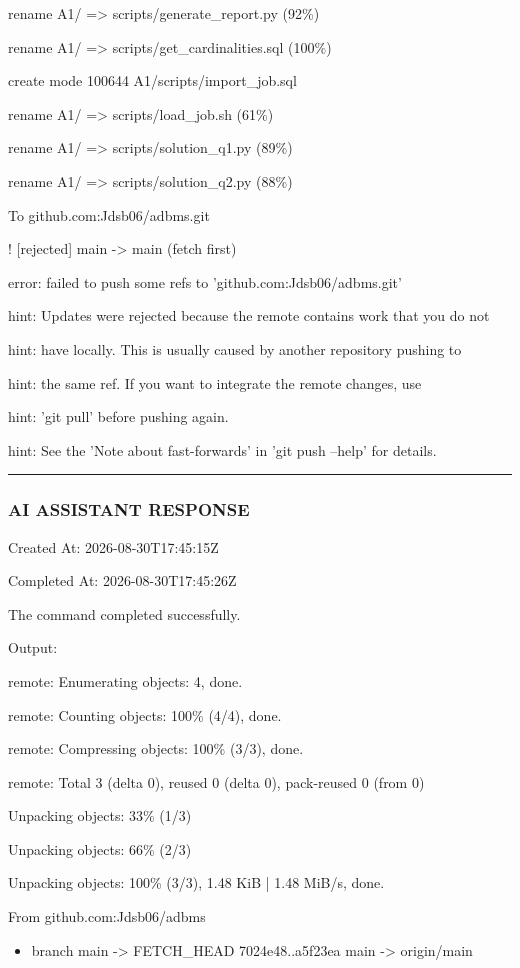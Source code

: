 \documentclass[11pt,a4paper]{article}
\begin{document}
{rename A1/{ => scripts}/generate\_report.py (92\%)

rename A1/{ => scripts}/get\_cardinalities.sql (100\%)

create mode 100644 A1/scripts/import\_job.sql

rename A1/{ => scripts}/load\_job.sh (61\%)

rename A1/{ => scripts}/solution\_q1.py (89\%)

rename A1/{ => scripts}/solution\_q2.py (88\%)

To github.com:Jdsb06/adbms.git

! [rejected]        main -> main (fetch first)

error: failed to push some refs to 'github.com:Jdsb06/adbms.git'

hint: Updates were rejected because the remote contains work that you do not

hint: have locally. This is usually caused by another repository pushing to

hint: the same ref. If you want to integrate the remote changes, use

hint: 'git pull' before pushing again.

hint: See the 'Note about fast-forwards' in 'git push --help' for details.


\hrule

\subsubsection{AI ASSISTANT RESPONSE}

Created At: 2026-08-30T17:45:15Z

Completed At: 2026-08-30T17:45:26Z


The command completed successfully.

Output:

remote: Enumerating objects: 4, done.

remote: Counting objects: 100\% (4/4), done.

remote: Compressing objects: 100\% (3/3), done.

remote: Total 3 (delta 0), reused 0 (delta 0), pack-reused 0 (from 0)

Unpacking objects:  33\% (1/3)

Unpacking objects:  66\% (2/3)

Unpacking objects: 100\% (3/3), 1.48 KiB | 1.48 MiB/s, done.

From github.com:Jdsb06/adbms

\begin{itemize}
\item branch            main       -> FETCH\_HEAD
7024e48..a5f23ea  main       -> origin/main


\end{itemize}}
\end{document}
